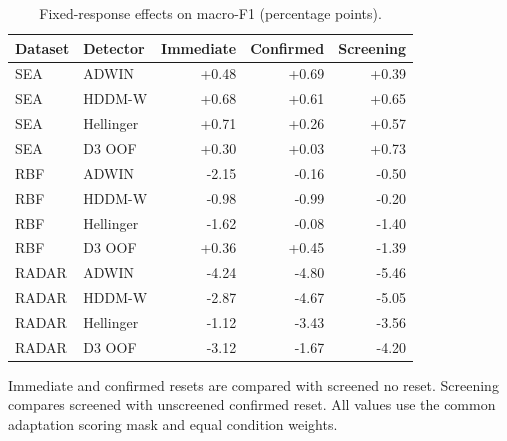 \begin{table}[htbp]
\centering\small\singlespacing
\caption{Fixed-response effects on macro-F1 (percentage points).}\label{tab:fixed}
\setlength{\tabcolsep}{4pt}
\renewcommand{\arraystretch}{1.18}
\begin{tabular}{@{}llrrr@{}}
\toprule
Dataset & Detector & Immediate & Confirmed & Screening \\
\midrule
SEA & ADWIN & +0.48 & +0.69 & +0.39 \\
SEA & HDDM-W & +0.68 & +0.61 & +0.65 \\
SEA & Hellinger & +0.71 & +0.26 & +0.57 \\
SEA & D3 OOF & +0.30 & +0.03 & +0.73 \\
RBF & ADWIN & -2.15 & -0.16 & -0.50 \\
RBF & HDDM-W & -0.98 & -0.99 & -0.20 \\
RBF & Hellinger & -1.62 & -0.08 & -1.40 \\
RBF & D3 OOF & +0.36 & +0.45 & -1.39 \\
RADAR & ADWIN & -4.24 & -4.80 & -5.46 \\
RADAR & HDDM-W & -2.87 & -4.67 & -5.05 \\
RADAR & Hellinger & -1.12 & -3.43 & -3.56 \\
RADAR & D3 OOF & -3.12 & -1.67 & -4.20 \\
\bottomrule
\end{tabular}
\par\smallskip\begin{minipage}{\textwidth}\footnotesize Immediate and confirmed resets are compared with screened no reset. Screening compares screened with unscreened confirmed reset. All values use the common adaptation scoring mask and equal condition weights.\end{minipage}
\end{table}
